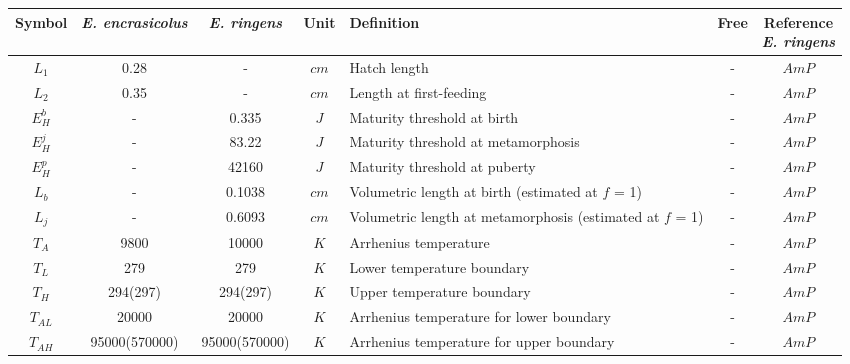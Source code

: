 \begin{table}[H]
\centering
\begin{adjustbox}{width=1.2\textwidth}
\begin{tabular}{c|c|c|c|l|c|c}
\hline
Symbol																&
\makecell[c]{\textit{E. encrasicolus} \\ {\cite{PethRoos2013}}}	&
\textit{E. ringens}													&
Unit																&
Definition															&
Free																&
\makecell[c]{Reference \\ \textit{E. ringens}}															\\
\hline
$L_{1}$			&
0.28			&
-				&
$cm$			&
Hatch length	&
-				&
$AmP$			\\
$L_{2}$						&
0.35						&
-							& 
$cm$						& 
Length at first-feeding		& 
-							&
$AmP$						\\
$E_{H}^{b}$						& 
-								& 
0.335							& 
$J$								& 
Maturity threshold at birth		& 
-								&
$AmP$							\\
$E_{H}^{j}$								&
-										& 
83.22									& 
$J$										& 
Maturity threshold at metamorphosis		& 
-										&
$AmP$									\\
$E_{H}^{p}$						& 
-								& 
42160							& 
$J$								& 
Maturity threshold at puberty	& 
-								&
$AmP$							\\
$L_{b}$												& 
-													& 
0.1038												& 
$cm$												& 
Volumetric length at birth (estimated at $f$ = 1)	& 
-													&
$AmP$												\\
$L_{j}$														& 
-															& 
0.6093														& 
$cm$														& 
Volumetric length at metamorphosis (estimated at $f$ = 1)	& 
-															&
$AmP$														\\
$T_{A}$					& 
9800					& 
10000					& 
$K$						& 
Arrhenius temperature	& 
-						&
$AmP$					\\
$T_{L}$						&
279							&
279							&
$K$							&
Lower temperature boundary	&
-							&
$AmP$						\\
$T_{H}$						&
294(297)					& 
294(297)					& 
$K$							& 
Upper temperature boundary	& 
-							&
$AmP$						\\
$T_{AL}$									& 
20000										& 
20000										& 
$K$											& 
Arrhenius temperature for lower boundary	&
-											&
$AmP$										\\
$T_{AH}$									& 
95000(570000)								& 
95000(570000)								& 
$K$											& 
Arrhenius temperature for upper boundary	& 
-											&
$AmP$										\\

\end{tabular}
\end{adjustbox}
\end{table}
